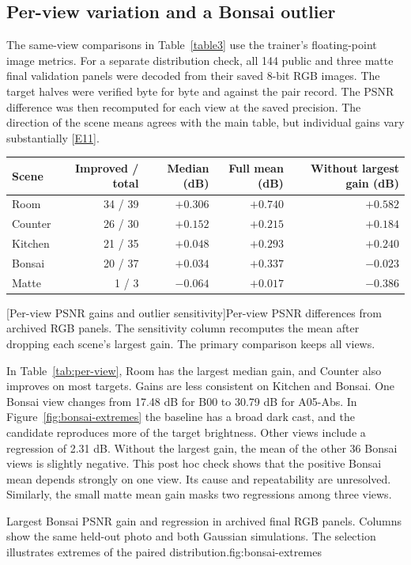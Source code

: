 \subsection{Per-view variation and a Bonsai outlier}
The same-view comparisons in Table~\ref{table3} use the trainer's floating-point image metrics. For a separate distribution check, all 144 public and three matte final validation panels were decoded from their saved 8-bit RGB images. The target halves were verified byte for byte and against the pair record. The PSNR difference was then recomputed for each view at the saved precision. The direction of the scene means agrees with the main table, but individual gains vary substantially [\hyperlink{evE11}{E11}].

\begin{center}\begin{minipage}{\linewidth}
\small\begin{tabular*}{\linewidth}{@{\extracolsep{\fill}}lrrrr@{}}
\toprule
Scene & Improved / total & Median (dB) & Full mean (dB) & Without largest gain (dB)\\
\midrule
Room & 34 / 39 & $+0.306$ & $+0.740$ & $+0.582$\\
Counter & 26 / 30 & $+0.152$ & $+0.215$ & $+0.184$\\
Kitchen & 21 / 35 & $+0.048$ & $+0.293$ & $+0.240$\\
Bonsai & 20 / 37 & $+0.034$ & $+0.337$ & $-0.023$\\
Matte & 1 / 3 & $-0.064$ & $+0.017$ & $-0.386$\\
\bottomrule
\end{tabular*}\par
{}[Per-view PSNR gains and outlier sensitivity]{Per-view PSNR differences from archived RGB panels. The sensitivity column recomputes the mean after dropping each scene's largest gain. The primary comparison keeps all views.}\label{tab:per-view}
\end{minipage}\end{center}

In Table~\ref{tab:per-view}, Room has the largest median gain, and Counter also improves on most targets. Gains are less consistent on Kitchen and Bonsai. One Bonsai view changes from 17.48 dB for B00 to 30.79 dB for A05-Abs. In Figure~\ref{fig:bonsai-extremes} the baseline has a broad dark cast, and the candidate reproduces more of the target brightness. Other views include a regression of 2.31 dB. Without the largest gain, the mean of the other 36 Bonsai views is slightly negative. This post hoc check shows that the positive Bonsai mean depends strongly on one view. Its cause and repeatability are unresolved. Similarly, the small matte mean gain masks two regressions among three views.

  {Largest Bonsai PSNR gain and regression in archived final RGB panels. Columns show the same held-out photo and both Gaussian simulations. The selection illustrates extremes of the paired distribution.}{fig:bonsai-extremes}

